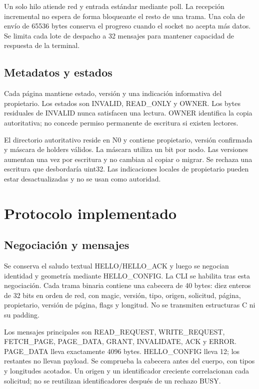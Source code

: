 \documentclass[conference]{IEEEtran}
\begin{document}
Un solo hilo atiende red y entrada estándar mediante poll. La recepción incremental
no espera de forma bloqueante el resto de una trama. Una cola de envío de 65536 bytes
conserva el progreso cuando el socket no acepta más datos. Se limita cada lote de
despacho a 32 mensajes para mantener capacidad de respuesta de la terminal.

\subsection{Metadatos y estados}
Cada página mantiene estado, versión y una indicación informativa del propietario.
Los estados son INVALID, READ\_ONLY y OWNER. Los bytes residuales de INVALID nunca
satisfacen una lectura. OWNER identifica la copia autoritativa; no concede permiso
permanente de escritura si existen lectores.

El directorio autoritativo reside en N0 y contiene propietario, versión confirmada y
máscara de holders válidos. La máscara utiliza un bit por nodo. Las versiones aumentan
una vez por escritura y no cambian al copiar o migrar. Se rechaza una escritura que
desbordaría uint32. Las indicaciones locales de propietario pueden estar desactualizadas
y no se usan como autoridad.

\section{Protocolo implementado}
\subsection{Negociación y mensajes}
Se conserva el saludo textual HELLO/HELLO\_ACK y luego se negocian identidad y geometría
mediante HELLO\_CONFIG. La CLI se habilita tras esta negociación. Cada trama binaria
contiene una cabecera de 40 bytes: diez enteros de 32 bits en orden de red, con magic,
versión, tipo, origen, solicitud, página, propietario, versión de página, flags y longitud.
No se transmiten estructuras C ni su padding.

Los mensajes principales son READ\_REQUEST, WRITE\_REQUEST, FETCH\_PAGE, PAGE\_DATA,
GRANT, INVALIDATE, ACK y ERROR. PAGE\_DATA lleva exactamente 4096 bytes. HELLO\_CONFIG
lleva 12; los restantes no llevan payload. Se comprueba la cabecera antes del cuerpo,
con tipos y longitudes acotados. Un origen y un identificador creciente correlacionan
cada solicitud; no se reutilizan identificadores después de un rechazo BUSY.
\end{document}
